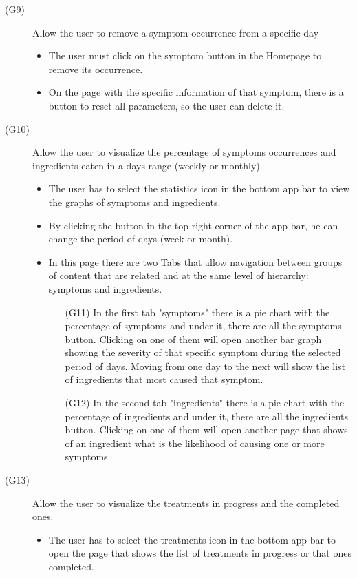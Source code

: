 \documentclass [12pt]{article}
\begin{document}
\begin{description}
\item[(G9)]Allow the user to remove a symptom occurrence from a specific day
\begin{itemize}
\item The user must click on the symptom button in the Homepage to remove its occurrence. 
\item On the page with the specific information of that symptom, there is a button to reset all parameters, so the user can delete it.
\end{itemize}
\end{description}

\begin{description}
\item[(G10)]Allow the user to visualize the percentage of symptoms occurrences and ingredients eaten in a days range (weekly or monthly).
\begin{itemize}
\item The user has to select the statistics icon in the bottom app bar to view the graphs of symptoms and ingredients. 
\item By clicking the button in the top right corner of the app bar, he can change the period of days (week or month). 
\item In this page there are two Tabs that allow navigation between groups of content that are related and at the same level of hierarchy: symptoms and ingredients.
\begin{itemize}[•]
\item[(G11)] In the first tab "symptoms" there is a pie chart with the percentage of symptoms and under it, there are all the symptoms button. Clicking on one of them will open another bar graph showing the severity of that specific symptom during the selected period of days. Moving from one day to the next will show the list of ingredients that most caused that symptom.
\item[(G12)] In the second tab "ingredients" there is a pie chart with the percentage of ingredients and under it, there are all the ingredients button. Clicking on one of them will open another page that shows of an ingredient what is the likelihood of causing one or more symptoms.
\end{itemize}
\end{itemize}
\end{description}

\begin{description}
\item[(G13)]Allow the user to visualize the treatments in progress and the completed ones.
\begin{itemize}
\item The user has to select the treatments icon in the bottom app bar to open the page that shows the list of treatments in progress or that ones completed.  
\end{itemize}
\end{description}
\end{document}
